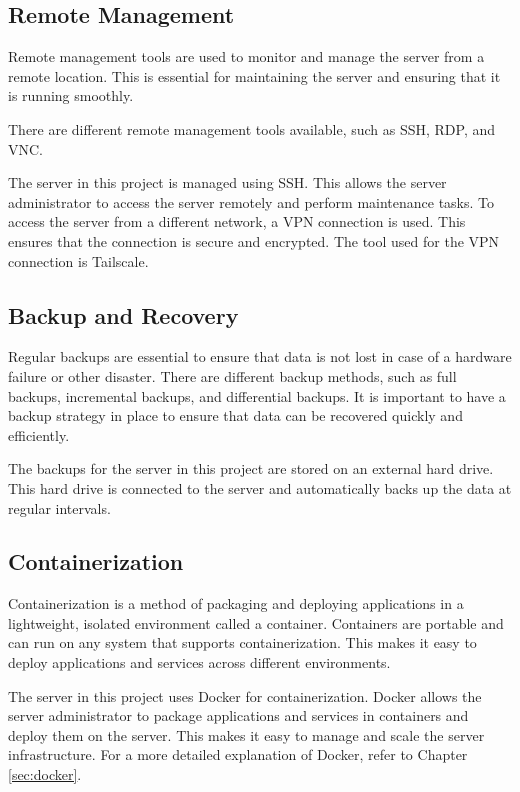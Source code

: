 \cite{networking}

\subsection{Remote Management}

Remote management tools are used to monitor and manage the server from a remote location.
This is essential for maintaining the server and ensuring that it is running smoothly.

There are different remote management tools available, such as SSH, RDP, and VNC. 

The server in this project is managed using SSH. This allows the server administrator to access the server remotely and perform maintenance tasks.
To access the server from a different network, a VPN connection is used. This ensures that the connection is secure and encrypted.
The tool used for the VPN connection is Tailscale.

\cite{remote_management}
\cite{Tailscale}

\subsection{Backup and Recovery}

Regular backups are essential to ensure that data is not lost in case of a hardware failure or other disaster.
There are different backup methods, such as full backups, incremental backups, and differential backups.
It is important to have a backup strategy in place to ensure that data can be recovered quickly and efficiently.

The backups for the server in this project are stored on an external hard drive. This hard drive is connected to the server and automatically backs up the data at regular intervals.

\subsection{Containerization}

Containerization is a method of packaging and deploying applications in a lightweight, isolated environment called a container.
Containers are portable and can run on any system that supports containerization.
This makes it easy to deploy applications and services across different environments.

The server in this project uses Docker for containerization. Docker allows the server administrator to package applications and services in containers and deploy them on the server.
This makes it easy to manage and scale the server infrastructure. For a more detailed explanation of Docker, refer to Chapter \ref{sec:docker}.


